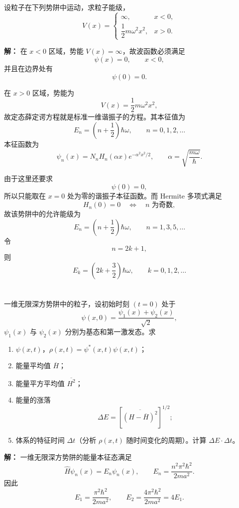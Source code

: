 \documentclass[10pt,a4paper]{article}
\begin{document}
\section{}
设粒子在下列势阱中运动，求粒子能级，
\[
V(x)=
\begin{cases}
\infty, & x<0,\\
\dfrac{1}{2}m\omega^2x^2, & x>0.
\end{cases}
\]

\vspace{0.5cm}

\noindent\textbf{解：}
在 \(x<0\) 区域，势能 \(V(x)=\infty\)，故波函数必须满足
\[
\psi(x)=0,\qquad x<0,
\]
并且在边界处有
\[
\psi(0)=0.
\]

在 \(x>0\) 区域，势能为
\[
V(x)=\frac{1}{2}m\omega^2x^2,
\]
故定态薛定谔方程就是标准一维谐振子的方程。其本征值为
\[
E_n=\left(n+\frac{1}{2}\right)\hbar\omega,
\qquad
n=0,1,2,\dots
\]
本征函数为
\[
\psi_n(x)=N_n H_n(\alpha x)e^{-\alpha^2x^2/2},
\qquad
\alpha=\sqrt{\frac{m\omega}{\hbar}}.
\]

由于这里还要求
\[
\psi(0)=0,
\]
所以只能取在 \(x=0\) 处为零的谐振子本征函数。而 Hermite 多项式满足
\[
H_n(0)=0 \quad \Longleftrightarrow \quad n \text{ 为奇数},
\]
故该势阱中的允许能级为
\[
E_n=\left(n+\frac{1}{2}\right)\hbar\omega,
\qquad n=1,3,5,\dots
\]
令
\[
n=2k+1,
\]
则
\[
E_k=\left(2k+\frac{3}{2}\right)\hbar\omega,
\qquad k=0,1,2,\dots
\]

\section{}
一维无限深方势阱中的粒子，设初始时刻 $(t=0)$ 处于
\[
\psi(x,0)=\frac{\psi_1(x)+\psi_2(x)}{\sqrt{2}},
\]
$\psi_1(x)$ 与 $\psi_2(x)$ 分别为基态和第一激发态。求
\begin{enumerate}[label=(\alph*)]
  \item $\psi(x,t)$，$\rho(x,t)=\psi^*(x,t)\psi(x,t)$；
  \item 能量平均值 $\overline{H}$；
  \item 能量平方平均值 $\overline{H^2}$；
  \item 能量的涨落
  \[
  \Delta E=\left[\overline{(H-\overline{H})^2}\right]^{1/2};
  \]
  \item 体系的特征时间 $\Delta t$（分析 $\rho(x,t)$ 随时间变化的周期）。计算 $\Delta E\cdot\Delta t$。
\end{enumerate}


\vspace{0.5cm}

\noindent\textbf{解：}
一维无限深方势阱的能量本征态满足
\[
\hat{H}\psi_n(x)=E_n\psi_n(x),
\qquad
E_n=\frac{n^2\pi^2\hbar^2}{2ma^2}.
\]
因此
\[
E_1=\frac{\pi^2\hbar^2}{2ma^2},
\qquad
E_2=\frac{4\pi^2\hbar^2}{2ma^2}=4E_1.
\]
\end{document}
